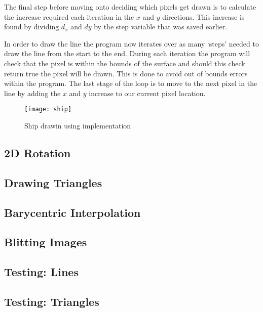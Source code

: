 \documentclass[
	letterpaper, %
	10pt, %
]{CSUniSchoolLabReport}
\begin{document}
\begin{flushleft}
	The final step before moving onto deciding which pixels get drawn is to calculate
	the increase required each iteration in the \(x\) and \(y\) directions.
	This increase is found by dividing \(d_x\) and \(dy\) by the step variable that was
	saved earlier. 
\end{flushleft}

\begin{flushleft}
	In order to draw the line the program now iterates over as many `steps'
	needed to draw the line from the start to the end. During each iteration
	the program will check that the pixel is within the bounds of the surface
	and should this check return true the pixel will be drawn. This is done to 
	avoid out of bounds errors within the program. The last stage of the loop is 
	to move to the next pixel in the line by adding the \(x\) and \(y\) increase 
	to our current pixel location.
\end{flushleft}



\begin{figure}[h]
	\centering
	\texttt{[image: ship]}
	\caption{Ship drawin using implementation}
\end{figure}

\subsection{2D Rotation}

\subsection{Drawing Triangles}

\subsection{Barycentric Interpolation}

\subsection{Blitting Images}

\subsection{Testing: Lines}

\subsection{Testing: Triangles}
\end{document}

